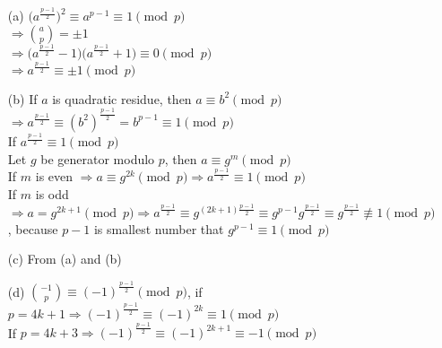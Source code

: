 \begin{exer}[3.37]
\begin{enumerate}
	\item [(a)] $\Big(a^{\frac{p-1}{2}}\Big)^2 \equiv a^{p-1} \equiv 1 \pmod p$ \\ $\Rightarrow \binom{a}{p} = \pm 1$ \\ $\Rightarrow \Big(a^{\frac{p-1}{2}} - 1\Big)\Big(a^{\frac{p-1}{2}} + 1\Big) \equiv 0 \pmod p$ \\ $\Rightarrow a^{\frac{p-1}{2}} \equiv \pm 1 \pmod p$
	\item [(b)] If $a$ is quadratic residue, then $a \equiv b^2 \pmod p$ \\ $\Rightarrow a^{\frac{p-1}{2}} \equiv (b^2)^{\frac{p-1}{2}} = b^{p-1} \equiv 1 \pmod p$ \\ If $a^{\frac{p-1}{2}} \equiv 1 \pmod p$ \\ Let $g$ be generator modulo $p$, then $a \equiv g^m \pmod p$ \\ If $m$ is even $\Rightarrow a \equiv g^{2k} \pmod p \Rightarrow a^{\frac{p-1}{2}} \equiv 1 \pmod p$ \\ If $m$ is odd $\Rightarrow a = g^{2k+1} \pmod p \Rightarrow a^{\frac{p-1}{2}} \equiv g^{(2k+1)\frac{p-1}{2}} \equiv g^{p-1} g^{\frac{p-1}{2}} \equiv g^{\frac{p-1}{2}}\not\equiv 1 \pmod p$, because $p-1$ is smallest number that $g^{p-1} \equiv 1 \pmod p$
	\item [(c)] From (a) and (b)
	\item [(d)] $\binom{-1}{p} \equiv (-1)^{\frac{p-1}{2}} \pmod p$, if $p=4k+1 \Rightarrow (-1)^{\frac{p-1}{2}} \equiv (-1)^{2k} \equiv 1 \pmod p$ \\ If $p=4k+3 \Rightarrow (-1)^{\frac{p-1}{2}} \equiv (-1)^{2k+1} \equiv -1 \pmod p$
\end{enumerate}
\end{exer}

